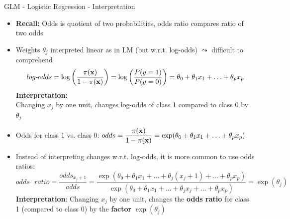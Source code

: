 \documentclass[11pt,compress,t,notes=noshow, aspectratio=169, xcolor=table]{beamer}
\begin{document}
\begin{frame}[c]{GLM - Logistic Regression - Interpretation}

    \begin{itemize}
        \item \textbf{Recall:} Odds is quotient of two probabilities, odds ratio compares ratio of two odds 
        \item Weights $\theta_j$ interpreted linear as in LM (but w.r.t. log-odds) $\leadsto$ difficult to comprehend
        $$log\text{-}odds = \log \left(\frac{\pi(\xv)}{1 - \pi(\xv)}\right) = \log \left(\frac{P(y=1)}{P(y=0)}\right) = \theta_0 + \theta_1 x_1 + \ldots + \theta_p x_p  $$
        \textbf{Interpretation:} \\ Changing $x_j$ by one unit, changes log-odds of class 1 compared to class 0 by $\theta_j$%
        \pause
        \item Odds for class 1 vs. class 0: %
        $odds = \displaystyle\frac{\pi(\xv)}{1 - \pi(\xv)}= \exp(\theta_0 + \theta_1 x_1 + \ldots + \theta_p x_p)$
        \item Instead of interpreting changes w.r.t. log-odds, it is more common to use odds ratios:
        $$odds\text{ }ratio = \frac{odds_{x_j+1}}{odds} = \frac{\exp(\theta_0 + \theta_1 x_1 + \ldots + \theta_j (x_j+1) + \ldots + \theta_p x_p)}{\exp(\theta_0 + \theta_1 x_1 + \ldots + \theta_j x_j + \ldots + \theta_p x_p)} = \exp{(\theta_j)} $$
        \textbf{Interpretation}: Changing $x_j$ by one unit, changes the \textbf{odds ratio} for class 1 (compared to class 0) by the \textbf{factor} $\exp(\theta_j)$
    \end{itemize}	

\end{frame}
\end{document}
